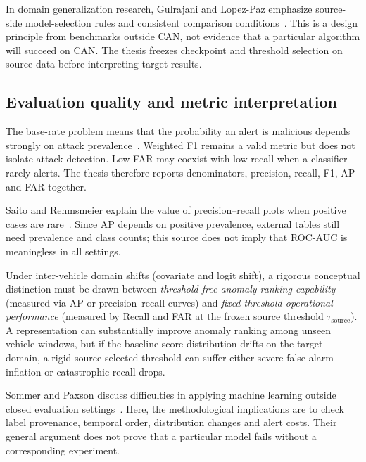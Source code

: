 \documentclass[12pt, a4paper, reqno, oneside]{book}
\begin{document}
In domain generalization research, Gulrajani and Lopez-Paz emphasize source-side model-selection rules and consistent comparison conditions~\cite{gulrajani2021domainbed}. This is a design principle from benchmarks outside CAN, not evidence that a particular algorithm will succeed on CAN. The thesis freezes checkpoint and threshold selection on source data before interpreting target results.

\subsection{Evaluation quality and metric interpretation}
The base-rate problem means that the probability an alert is malicious depends strongly on attack prevalence~\cite{axelsson2000base}. Weighted F1 remains a valid metric but does not isolate attack detection. Low FAR may coexist with low recall when a classifier rarely alerts. The thesis therefore reports denominators, precision, recall, F1, AP and FAR together.

Saito and Rehmsmeier explain the value of precision--recall plots when positive cases are rare~\cite{saito2015pr}. Since AP depends on positive prevalence, external tables still need prevalence and class counts; this source does not imply that ROC-AUC is meaningless in all settings.

Under inter-vehicle domain shifts (covariate and logit shift), a rigorous conceptual distinction must be drawn between \textit{threshold-free anomaly ranking capability} (measured via AP or precision--recall curves) and \textit{fixed-threshold operational performance} (measured by Recall and FAR at the frozen source threshold $\tau_{\text{source}}$). A representation can substantially improve anomaly ranking among unseen vehicle windows, but if the baseline score distribution drifts on the target domain, a rigid source-selected threshold can suffer either severe false-alarm inflation or catastrophic recall drops.

Sommer and Paxson discuss difficulties in applying machine learning outside closed evaluation settings~\cite{sommer2010outside}. Here, the methodological implications are to check label provenance, temporal order, distribution changes and alert costs. Their general argument does not prove that a particular model fails without a corresponding experiment.
\end{document}
